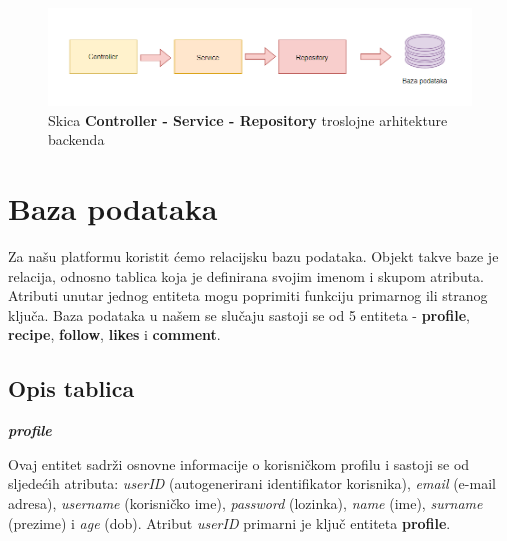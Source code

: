\bigskip
   
   			\begin{figure}[H]
			    \centering
			    \includegraphics[width=1\linewidth]{slike/csr_arh.png}
			    \caption{Skica \textbf{Controller - Service - Repository} troslojne arhitekture backenda}
			    \label{fig:enter-label}
			\end{figure}

   \eject

		\section{Baza podataka}
			
		Za našu platformu koristit ćemo relacijsku bazu podataka. Objekt takve baze je relacija, odnosno tablica koja je definirana svojim imenom i skupom atributa. Atributi unutar jednog entiteta mogu poprimiti funkciju primarnog ili stranog ključa.
Baza podataka u našem se slučaju sastoji se od 5 entiteta - \textbf{profile}, \textbf{recipe}, \textbf{follow}, \textbf{likes} i \textbf{comment}.
		
			\subsection{Opis tablica}

\noindent \textbf{\textit{profile}}\\
\begin{samepage}
Ovaj entitet sadrži osnovne informacije o korisničkom profilu i  sastoji se od sljedećih atributa: \textit{userID} (autogenerirani identifikator korisnika), \textit{email }(e-mail adresa), \textit{username} (korisničko ime), \textit{password} (lozinka), \textit{name} (ime), \textit{surname} (prezime) i \textit{age} (dob). Atribut\textit{ userID} primarni je ključ entiteta \textbf{profile}. 
\end{samepage}

